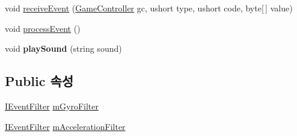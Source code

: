 \begin{DoxyCompactItemize}
\item 
void \hyperlink{class_event_manager_ae034ed89247a369411c89f135c836bd9}{receive\+Event} (\hyperlink{class_game_controller}{Game\+Controller} gc, ushort type, ushort code, byte\mbox{[}$\,$\mbox{]} value)
\item 
void \hyperlink{class_event_manager_a84d2c420c890acdc95571366a8b55c74}{process\+Event} ()
\item 
\hypertarget{class_event_manager_a72f2d57c83c611bf39e5dce2a936c4f2}{}void {\bfseries play\+Sound} (string sound)\label{class_event_manager_a72f2d57c83c611bf39e5dce2a936c4f2}

\end{DoxyCompactItemize}
\subsection*{Public 속성}
\begin{DoxyCompactItemize}
\item 
\hyperlink{interface_i_event_filter}{I\+Event\+Filter} \hyperlink{class_event_manager_a7cee85488f5d7220c102cd945b1f494a}{m\+Gyro\+Filter}
\item 
\hyperlink{interface_i_event_filter}{I\+Event\+Filter} \hyperlink{class_event_manager_a2e8707f51be09be7f400bd9cca230b3a}{m\+Acceleration\+Filter}
\end{DoxyCompactItemize}
